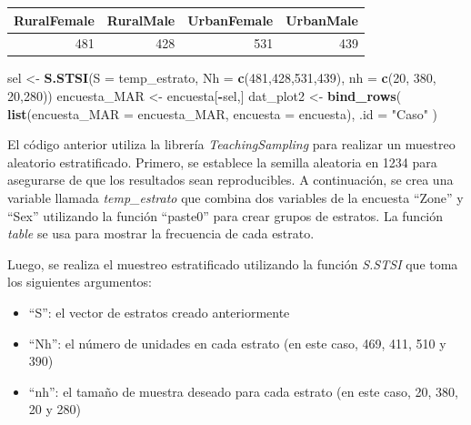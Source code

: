 \documentclass[
  12pt,
]{book}
\newenvironment{Shaded}{\begin{snugshade}}{\end{snugshade}}
\newcommand{\AttributeTok}[1]{\textcolor[rgb]{0.13,0.29,0.53}{#1}}
\newcommand{\DecValTok}[1]{\textcolor[rgb]{0.00,0.00,0.81}{#1}}
\newcommand{\FunctionTok}[1]{\textcolor[rgb]{0.13,0.29,0.53}{\textbf{#1}}}
\newcommand{\NormalTok}[1]{#1}
\newcommand{\OtherTok}[1]{\textcolor[rgb]{0.56,0.35,0.01}{#1}}
\newcommand{\SpecialCharTok}[1]{\textcolor[rgb]{0.81,0.36,0.00}{\textbf{#1}}}
\newcommand{\StringTok}[1]{\textcolor[rgb]{0.31,0.60,0.02}{#1}}
\providecommand{\tightlist}{%
  \setlength{\itemsep}{0pt}\setlength{\parskip}{0pt}}
\begin{document}
\begin{tabular}{r|r|r|r}
\hline
RuralFemale & RuralMale & UrbanFemale & UrbanMale\\
\hline
481 & 428 & 531 & 439\\
\hline
\end{tabular}

\begin{Shaded}
\begin{Highlighting}[]
\NormalTok{sel }\OtherTok{\textless{}{-}} \FunctionTok{S.STSI}\NormalTok{(}\AttributeTok{S =}\NormalTok{ temp\_estrato, }
              \AttributeTok{Nh =} \FunctionTok{c}\NormalTok{(}\DecValTok{481}\NormalTok{,}\DecValTok{428}\NormalTok{,}\DecValTok{531}\NormalTok{,}\DecValTok{439}\NormalTok{),}
              \AttributeTok{nh =} \FunctionTok{c}\NormalTok{(}\DecValTok{20}\NormalTok{, }\DecValTok{380}\NormalTok{, }\DecValTok{20}\NormalTok{,}\DecValTok{280}\NormalTok{))}
\NormalTok{encuesta\_MAR }\OtherTok{\textless{}{-}}\NormalTok{ encuesta[}\SpecialCharTok{{-}}\NormalTok{sel,]}
\NormalTok{dat\_plot2 }\OtherTok{\textless{}{-}} \FunctionTok{bind\_rows}\NormalTok{(}
  \FunctionTok{list}\NormalTok{(}\AttributeTok{encuesta\_MAR =}\NormalTok{ encuesta\_MAR,}
       \AttributeTok{encuesta =}\NormalTok{ encuesta), }\AttributeTok{.id =} \StringTok{"Caso"}\NormalTok{  )}
\end{Highlighting}
\end{Shaded}

El código anterior utiliza la librería \emph{TeachingSampling} para realizar un muestreo aleatorio estratificado. Primero, se establece la semilla aleatoria en 1234 para asegurarse de que los resultados sean reproducibles. A continuación, se crea una variable llamada \emph{temp\_estrato} que combina dos variables de la encuesta ``Zone'' y ``Sex'' utilizando la función ``paste0'' para crear grupos de estratos. La función \emph{table} se usa para mostrar la frecuencia de cada estrato.

Luego, se realiza el muestreo estratificado utilizando la función \emph{S.STSI} que toma los siguientes argumentos:

\begin{itemize}
\tightlist
\item
  ``S'': el vector de estratos creado anteriormente
\item
  ``Nh'': el número de unidades en cada estrato (en este caso, 469, 411, 510 y 390)
\item
  ``nh'': el tamaño de muestra deseado para cada estrato (en este caso, 20, 380, 20 y 280)
\end{itemize}
\end{document}
